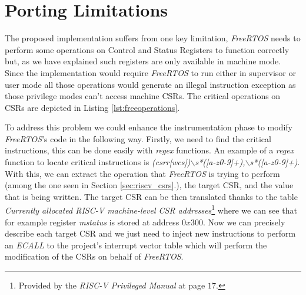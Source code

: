 \section{Porting Limitations}
\label{sec:rtos_limitations}

The proposed implementation suffers from one key limitation, \textit{FreeRTOS}
needs to perform some operations on Control and Status Registers to function
correctly but, as we have explained such registers are only available in machine
mode. Since the implementation would require \textit{FreeRTOS} to run either in supervisor
or user mode all those operations would generate an illegal instruction exception
as those privilege modes can't access machine CSRs. The critical operations on
CSRs are depicted in Listing \ref{lst:freeoperations}.

To address this problem we could enhance the instrumentation phase to modify
\textit{FreeRTOS}'s code in the following way. Firstly, we need to find the critical
instructions, this can be done easily with \textit{regex} functions. An example
of a \textit{regex} function to locate critical instructions is \textit{(csrr[wcs])$\backslash$s*([a-z0-9]+),$\backslash$s*([a-z0-9]+)}.
With this, we can extract the operation that \textit{FreeRTOS} is trying to perform
(among the one seen in Section \ref{sec:riscv_csrs}.), the target CSR, and the
value that is being written. The target CSR can be then translated thanks to the
table \textit{Currently allocated RISC-V machine-level CSR addresses}\footnote{Provided
by the \textit{RISC-V Privileged Manual}\cite{riscv} at page $17$.} where we can
see that for example register \textit{mstatus} is stored at address $0x300$. Now
we can precisely describe each target CSR and we just need to inject new instructions
to perform an \textit{ECALL} to the project's interrupt vector table which will
perform the modification of the CSRs on behalf of \textit{FreeRTOS}.

